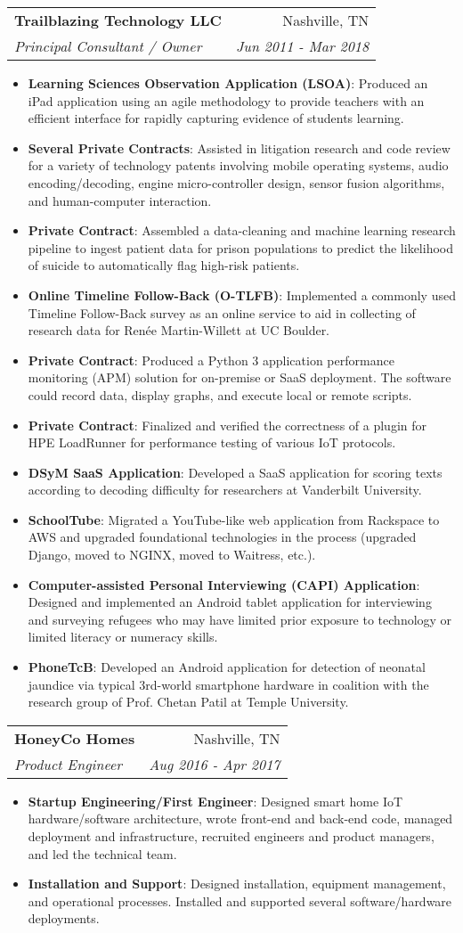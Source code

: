 \documentclass[letterpaper,10pt]{article}
\makeatletter
\newcommand{\resumeItem}[2]{
  \item\small{
    \textbf{#1}{: #2 \vspace{-2pt}}
  }
}
\newcommand{\resumeSubheading}[4]{
  \vspace{-1pt}\item
    \begin{tabular*}{0.97\textwidth}{l@{\extracolsep{\fill}}r}
      \textbf{#1} & #2 \\
      \textit{\small#3} & \textit{\small #4} \\
    \end{tabular*}\vspace{-5pt}
}
\newcommand{\resumeItemListStart}{\begin{itemize}}
\newcommand{\resumeItemListEnd}{\end{itemize}\vspace{-5pt}}
\makeatother
\begin{document}
    \resumeSubheading
      {Trailblazing Technology LLC}{Nashville, TN}
      {Principal Consultant / Owner}{Jun 2011 - Mar 2018}
      \resumeItemListStart
        \resumeItem{Learning Sciences Observation Application (LSOA)}
          {Produced an iPad application using an agile methodology to provide teachers with an efficient interface for rapidly capturing evidence of students learning.}
        \resumeItem{Several Private Contracts}
          {Assisted in litigation research and code review for a variety of technology patents involving mobile operating systems, audio encoding/decoding, engine micro-controller design, sensor fusion algorithms, and human-computer interaction.}
        \resumeItem{Private Contract}
          {Assembled a data-cleaning and machine learning research pipeline to ingest patient data for prison populations to predict the likelihood of suicide to automatically flag high-risk patients.}
        \resumeItem{Online Timeline Follow-Back (O-TLFB)}
          {Implemented a commonly used Timeline Follow-Back survey as an online service to aid in collecting of research data for Renée Martin-Willett at UC Boulder.}
        \resumeItem{Private Contract}
          {Produced a Python 3 application performance monitoring (APM) solution for on-premise or SaaS deployment. The software could record data, display graphs, and execute local or remote scripts.}
        \resumeItem{Private Contract}
          {Finalized and verified the correctness of a plugin for HPE LoadRunner for performance testing of various IoT protocols.}
        \resumeItem{DSyM SaaS Application}
          {Developed a SaaS application for scoring texts according to decoding difficulty for researchers at Vanderbilt University.}
        \resumeItem{SchoolTube}
          {Migrated a YouTube-like web application from Rackspace to AWS and upgraded foundational technologies in the process (upgraded Django, moved to NGINX, moved to Waitress, etc.).}
        \resumeItem{Computer-assisted Personal Interviewing (CAPI) Application}
         {Designed and implemented an Android tablet application for interviewing and surveying refugees who may have limited prior exposure to technology or limited literacy or numeracy skills.}
        \resumeItem{PhoneTcB}
          {Developed an Android application for detection of neonatal jaundice via typical 3rd-world smartphone hardware in coalition with the research group of Prof. Chetan Patil at Temple University.}
      \resumeItemListEnd

    \resumeSubheading
      {HoneyCo Homes}{Nashville, TN}
      {Product Engineer}{Aug 2016 - Apr 2017}
      \resumeItemListStart
        \resumeItem{Startup Engineering/First Engineer}
          {Designed smart home IoT hardware/software architecture, wrote front-end and back-end code, managed deployment and infrastructure, recruited engineers and product managers, and led the technical team.}
        \resumeItem{Installation and Support}
          {Designed installation, equipment management, and operational processes. Installed and supported several software/hardware deployments.}
      \resumeItemListEnd
\end{document}
